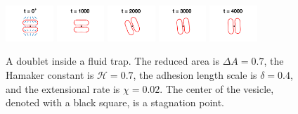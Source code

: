 \documentclass[prf,superscriptaddress,showpacs]{revtex4-1}
\begin{document}
\begin{figure}[htp]
  \includegraphics[width = 0.16\textwidth,trim={4cm 2cm 4cm 1cm},clip]{figs/extensional_adR4em1adS7em1Chi2em2_ra070_image01.png}
  \includegraphics[width = 0.16\textwidth,trim={4cm 2cm 4cm 1cm},clip]{figs/extensional_adR4em1adS7em1Chi2em2_ra070_image02.png}
  \includegraphics[width = 0.16\textwidth,trim={4cm 2cm 4cm 1cm},clip]{figs/extensional_adR4em1adS7em1Chi2em2_ra070_image03.png}
  \includegraphics[width = 0.16\textwidth,trim={4cm 2cm 4cm 1cm},clip]{figs/extensional_adR4em1adS7em1Chi2em2_ra070_image04.png}
  \includegraphics[width = 0.16\textwidth,trim={4cm 2cm 4cm 1cm},clip]{figs/extensional_adR4em1adS7em1Chi2em2_ra070_image05.png}
  \caption{\label{fig:extensional1} A doublet inside a fluid trap.  The
  reduced area is $\Delta A = 0.7$, the Hamaker constant is $\mathcal{H} =
  0.7$, the adhesion length scale is $\delta = 0.4$, and the extensional
  rate is $\chi = 0.02$.  The center of the vesicle, denoted with a
  black square, is a stagnation point.}


\end{figure}
\end{document}
